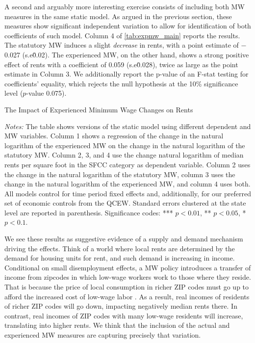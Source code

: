 A second and arguably more interesting exercise consists of including both MW measures in
the same static model. As argued in the previous section, these measures show significant
independent variation to allow for identification of both coefficients of such model. 
Column 4 of \autoref{tab:expmw_main} reports the results. The statutory MW induces
a slight \textit{decrease} in rents, with a point estimate of $-$0.027 (s.e\. 0.02). The 
experienced MW, on the other hand, shows a strong positive effect of rents with a 
coefficient of 0.059 (s.e\. 0.028), twice as large as the point estimate in Column 3. We
additionally report the p-value of an F-stat testing for coefficients' equality, which rejects the
null hypothesis at the 10\% significance level ($p$-value 0.075). 

\begin{table}[htb!]\centering
	\caption{The Impact of Experienced Minimum Wage Changes on Rents}
	\label{tab:expmw_main}
	
	\begin{minipage}{0.95\textwidth}\footnotesize
		\vspace{3mm}	
		\textit{Notes:} The table shows versions of the static model using different 
		dependent and MW variables. Column 1 shows a regression of the change in the natural 
		logarithm of the experienced MW on the change in the natural logarithm of the 
		statutory MW. Column 2, 3, and 4 use the change natural logarithm of median rents per 
		square foot in the SFCC category as dependent variable. Column 2 uses the change in 
		the natural logarithm of the statutory MW, column 3 uses the change in the natural 
		logarithm of the experienced MW, and column 4 uses both. All models control for time 
		period fixed effects and, additionally, for our preferred set of economic controls 
		from the QCEW. 
		Standard errors clustered at the state level are reported in parenthesis. Significance 
		codes: *** $p < 0.01$, ** $p < 0.05$, * $p < 0.1$.
	\end{minipage}
\end{table}

We see these results as suggestive evidence of a supply and demand mechanism driving the 
effects. Think of a world where local rents are determined by the demand for housing units for
rent, and such demand is increasing in income. Conditional on small disemployment effects, a MW
policy introduces a transfer of income from zipcodes in which low-wage workers work to those 
where they reside. That is because the price of local consumption in richer ZIP codes must go 
up to afford the increased cost of low-wage labor \parencite[as exemplified by, e.g.,][]
{allegretto2018local}. As a result, real incomes of residents of richer ZIP codes will go down, 
impacting negatively median rents there. In contrast, real incomes of ZIP codes with many 
low-wage residents will increase, translating into higher rents. We think that the inclusion 
of the actual and experienced MW measures are capturing precisely that variation.
